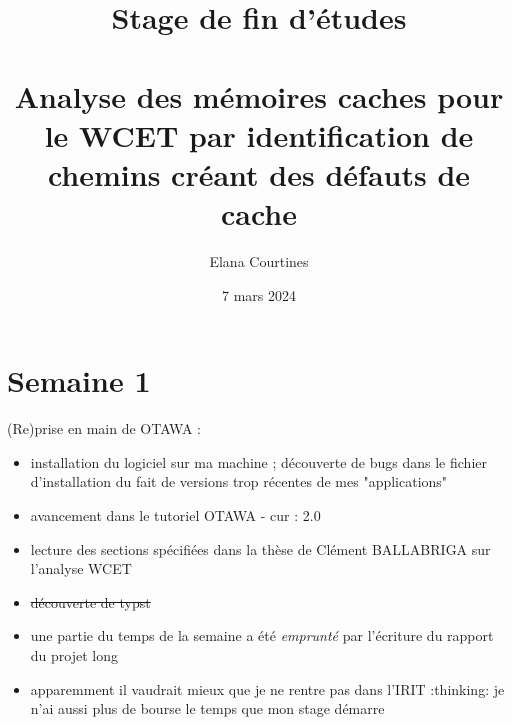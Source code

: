 \documentclass[a4paper,12pt]{article}
\title{Stage de fin d'études\\ \vspace*{20mm} \scalebox{2}{Rapport d'avancement}\\ \vspace*{20mm} Analyse des mémoires caches pour le WCET par identification de chemins créant des défauts de cache}
\author{Elana Courtines}
\date{7 mars 2024}
\begin{document}
\maketitle


\section{Semaine 1}



(Re)prise en main de OTAWA :

\begin{itemize}
    \item installation du logiciel sur ma machine ; découverte de bugs dans le fichier d'installation du fait de versions trop récentes de mes "applications"
    \item avancement dans le tutoriel OTAWA - cur : 2.0
    \item lecture des sections spécifiées dans la thèse de Clément BALLABRIGA sur l'analyse WCET
    \item \sout{découverte de typst}
    \item une partie du temps de la semaine a été \textit{emprunté} par l'écriture du rapport du projet long
    \item apparemment il vaudrait mieux que je ne rentre pas dans l'IRIT :thinking: je n'ai aussi plus de bourse le temps que mon stage démarre 
\end{itemize}
\end{document}
